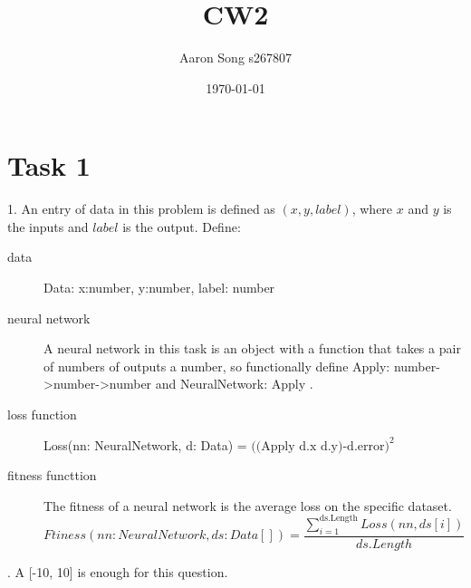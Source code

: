 \documentclass[12pt]{article}
\author{Aaron Song s267807}
\title{CW2}
\date{\today}
\begin{document}
\maketitle



\section{Task 1}

1. An entry of data in this problem is defined as $(x,y,label)$, where $x$ and $y$ is the inputs and $label$ is the output. Define:
\begin{description}
    \item[data] Data: x:number, y:number, label: number
    \item[neural network] A neural network in this task is an object with a function that takes a pair of numbers of outputs a number, so functionally define Apply: number->number->number and NeuralNetwork: { Apply }.
    \item[loss function] Loss(nn: NeuralNetwork, d: Data) = $((\textrm{Apply d.x d.y)-d.error)}^2$
    \item[fitness functtion] The fitness of a neural network is the average loss on the specific dataset. $$Ftiness(nn: NeuralNetwork, ds: Data[]) = \frac{\sum_{i=1}^{\textrm{ds.Length}}Loss(nn, ds[i])}{ds.Length}$$
\end{description}

. A [-10, 10] is enough for this question.
\end{document}
